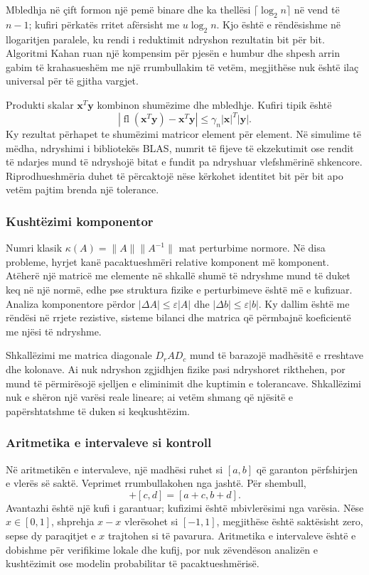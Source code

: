 \documentclass[11pt,oneside,openany]{book}
\newcommand{\vect}[1]{\bm{#1}}
\begin{document}
Mbledhja në çift formon një pemë binare dhe ka thellësi $\lceil\log_2n\rceil$ në vend të $n-1$; kufiri përkatës rritet afërsisht me $u\log_2n$. Kjo është e rëndësishme në llogaritjen paralele, ku rendi i reduktimit ndryshon rezultatin bit për bit. Algoritmi Kahan ruan një kompensim për pjesën e humbur dhe shpesh arrin gabim të krahasueshëm me një rrumbullakim të vetëm, megjithëse nuk është ilaç universal për të gjitha vargjet.

Produkti skalar $\vect x^T\vect y$ kombinon shumëzime dhe mbledhje. Kufiri tipik është
\begin{equation}
 |\operatorname{fl}(\vect x^T\vect y)-\vect x^T\vect y|
 \le\gamma_n |\vect x|^T|\vect y|.
\end{equation}
Ky rezultat përhapet te shumëzimi matricor element për element. Në simulime të mëdha, ndryshimi i bibliotekës BLAS, numrit të fijeve të ekzekutimit ose rendit të ndarjes mund të ndryshojë bitat e fundit pa ndryshuar vlefshmërinë shkencore. Riprodhueshmëria duhet të përcaktojë nëse kërkohet identitet bit për bit apo vetëm pajtim brenda një tolerance.

\subsubsection{Kushtëzimi komponentor}
Numri klasik $\kappa(A)=\|A\|\|A^{-1}\|$ mat perturbime normore. Në disa probleme, hyrjet kanë pacaktueshmëri relative komponent më komponent. Atëherë një matricë me elemente në shkallë shumë të ndryshme mund të duket keq në një normë, edhe pse struktura fizike e perturbimeve është më e kufizuar. Analiza komponentore përdor $|\Delta A|\le\varepsilon|A|$ dhe $|\Delta b|\le\varepsilon|b|$. Ky dallim është me rëndësi në rrjete rezistive, sisteme bilanci dhe matrica që përmbajnë koeficientë me njësi të ndryshme.

Shkallëzimi me matrica diagonale $D_rAD_c$ mund të barazojë madhësitë e rreshtave dhe kolonave. Ai nuk ndryshon zgjidhjen fizike pasi ndryshoret rikthehen, por mund të përmirësojë sjelljen e eliminimit dhe kuptimin e tolerancave. Shkallëzimi nuk e shëron një varësi reale lineare; ai vetëm shmang që njësitë e papërshtatshme të duken si keqkushtëzim.

\subsubsection{Aritmetika e intervaleve si kontroll}
Në aritmetikën e intervaleve, një madhësi ruhet si $[a,b]$ që garanton përfshirjen e vlerës së saktë. Veprimet rrumbullakohen nga jashtë. Për shembull,
\begin{equation}
 [a,b]+[c,d]=[a+c,b+d].
\end{equation}
Avantazhi është një kufi i garantuar; kufizimi është mbivlerësimi nga varësia. Nëse $x\in[0,1]$, shprehja $x-x$ vlerësohet si $[-1,1]$, megjithëse është saktësisht zero, sepse dy paraqitjet e $x$ trajtohen si të pavarura. Aritmetika e intervaleve është e dobishme për verifikime lokale dhe kufij, por nuk zëvendëson analizën e kushtëzimit ose modelin probabilitar të pacaktueshmërisë.
\end{document}
